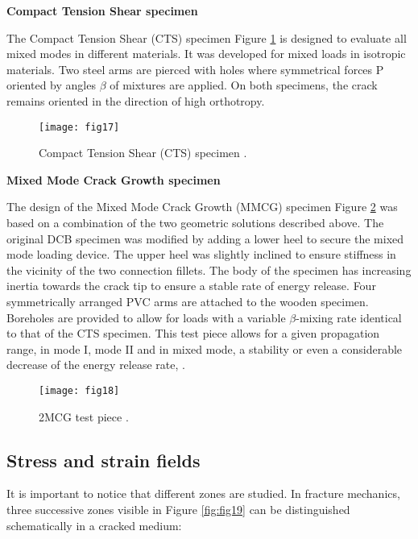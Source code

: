 \textbf{Compact Tension Shear specimen}

The Compact Tension Shear (CTS) specimen Figure \ref{fig:fig17} is designed to evaluate all mixed modes in different materials. It was developed for mixed loads in isotropic materials. Two steel arms are pierced with holes where symmetrical forces P oriented by angles $\beta$ of mixtures are applied. On both specimens, the crack remains oriented in the direction of high orthotropy.

\begin{figure}[tp]
	\centering
	\texttt{[image: fig17]}
	\caption{Compact Tension Shear (CTS) specimen \citep{Valentin1989}.}
	\label{fig:fig17}
\end{figure}

\textbf{Mixed Mode Crack Growth specimen}

The design of the Mixed Mode Crack Growth (MMCG) specimen Figure \ref{fig:fig18} was based on a combination of the two geometric solutions described above. The original DCB specimen was modified by adding a lower heel to secure the mixed mode loading device. The upper heel was slightly inclined to ensure stiffness in the vicinity of the two connection fillets. The body of the specimen has increasing inertia towards the crack tip to ensure a stable rate of energy release. Four symmetrically arranged PVC arms are attached to the wooden specimen. Boreholes are provided to allow for loads with a variable $\beta$-mixing rate identical to that of the CTS specimen. This test piece allows for a given propagation range, in mode I, mode II and in mixed mode, a stability or even a considerable decrease of the energy release rate, \citep{MoutouPitti2008}.





\begin{figure}[tp]
	\centering
	\texttt{[image: fig18]}
	\caption{2MCG test piece \citep{MoutouPitti2008}.}
	\label{fig:fig18}
\end{figure}

\subsection{Stress and strain fields}

It is important to notice that different zones are studied. In fracture mechanics, three successive zones visible in Figure \ref{fig:fig19} can be distinguished schematically in a cracked medium:

